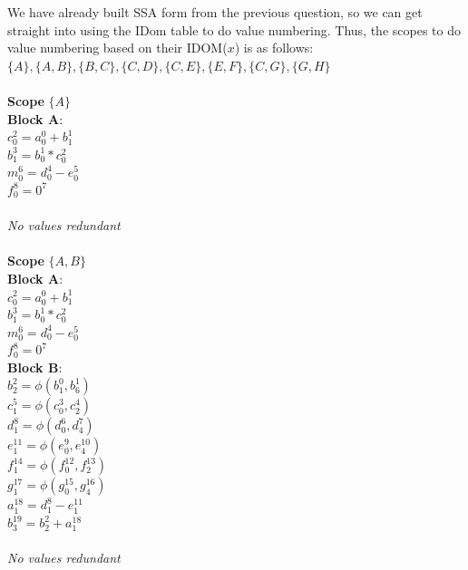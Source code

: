 \documentclass[11pt]{article}
\begin{document}
\begin{enumerate}
\begin{Answer}
		      We have already built SSA form from the previous question, so we can get straight into using the IDom table to do value numbering. Thus, the scopes to do value numbering based on their IDOM($x$) is as follows:
		      $\{A\}, \{A, B\}, \{B, C\}, \{C, D\}, \{C, E\}, \{E, F\}, \{C, G\}, \{G, H\} $
		      \\ \\
		      \textbf{Scope} $\{A\}$ \\
		      \textbf{Block A}: \\
		      $c_0^2 = a_0^0 + b_1^1$ \\
		      $b_1^3 = b_0^1 * c_0^2$ \\
		      $m_0^6 = d_0^4 - e_0^5$ \\
		      $f_0^8 = 0^7$ \\
		      \\
		      \textit{No values redundant} \\
		      \\
		      \textbf{Scope} $\{A, B\}$ \\
		      \textbf{Block A}: \\
		      $c_0^2 = a_0^0 + b_1^1$ \\
		      $b_1^3 = b_0^1 * c_0^2$ \\
		      $m_0^6 = d_0^4 - e_0^5$ \\
		      $f_0^8 = 0^7$ \\

		      \textbf{Block B}: \\
		      $b_2^2 = \phi(b_1^0, b_6^1)$ \\
		      $c_1^5 = \phi(c_0^3, c_2^4)$ \\
		      $d_1^8 = \phi(d_0^6, d_4^7)$ \\
		      $e_1^{11} = \phi(e_0^9, e_4^{10})$ \\
		      $f_1^{14} = \phi(f_0^{12}, f_2^{13})$ \\
		      $g_1^{17} = \phi(g_0^{15}, g_4^{16})$ \\
		      $a_1^{18} = d_1^8 - e_1^{11}$ \\
		      $b_3^{19} = b_2^2 + a_1^{18}$ \\
		      \\
		      \textit{No values redundant} \\
		      \\


\end{Answer}
\end{enumerate}
\end{document}
